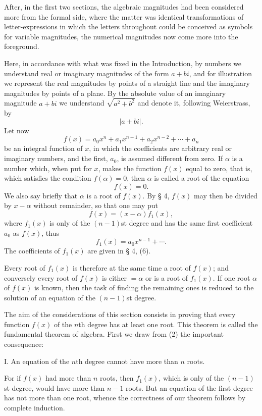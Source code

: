 \documentclass[11pt]{article}
\begin{document}
After, in the first two sections, the algebraic magnitudes had been considered more from the formal side, where the matter was identical transformations of letter-expressions in which the letters throughout could be conceived as symbols for variable magnitudes, the numerical magnitudes now come more into the foreground.

Here, in accordance with what was fixed in the Introduction, by numbers we understand real or imaginary magnitudes of the form $a+bi$, and for illustration we represent the real magnitudes by points of a straight line and the imaginary magnitudes by points of a plane. By the absolute value of an imaginary magnitude $a+bi$ we understand $\sqrt{a^2+b^2}$ and denote it, following Weierstrass, by
\[
 |a+bi|.
\]
Let now
\begin{equation}
 f(x)=a_0x^n+a_1x^{n-1}+a_2x^{n-2}+\cdots+a_n
\tag{1}
\end{equation}
be an integral function of $x$, in which the coefficients are arbitrary real or imaginary numbers, and the first, $a_0$, is assumed different from zero. If $\alpha$ is a number which, when put for $x$, makes the function $f(x)$ equal to zero, that is, which satisfies the condition $f(\alpha)=0$, then $\alpha$ is called a root of the equation
\[
 f(x)=0.
\]
We also say briefly that $\alpha$ is a root of $f(x)$. By § 4, $f(x)$ may then be divided by $x-\alpha$ without remainder, so that one may put
\begin{equation}
 f(x)=(x-\alpha)f_1(x),
\tag{2}
\end{equation}
where $f_1(x)$ is only of the $(n-1)$st degree and has the same first coefficient $a_0$ as $f(x)$, thus
\[
 f_1(x)=a_0x^{n-1}+\cdots .
\]
The coefficients of $f_1(x)$ are given in § 4, (6).

Every root of $f_1(x)$ is therefore at the same time a root of $f(x)$; and conversely every root of $f(x)$ is either $=\alpha$ or is a root of $f_1(x)$. If one root $\alpha$ of $f(x)$ is known, then the task of finding the remaining ones is reduced to the solution of an equation of the $(n-1)$st degree.

The aim of the considerations of this section consists in proving that every function $f(x)$ of the $n$th degree has at least one root. This theorem is called the fundamental theorem of algebra. First we draw from (2) the important consequence:

\medskip
\noindent I. An equation of the $n$th degree cannot have more than $n$ roots.
\medskip

For if $f(x)$ had more than $n$ roots, then $f_1(x)$, which is only of the $(n-1)$st degree, would have more than $n-1$ roots. But an equation of the first degree has not more than one root, whence the correctness of our theorem follows by complete induction.
\end{document}
